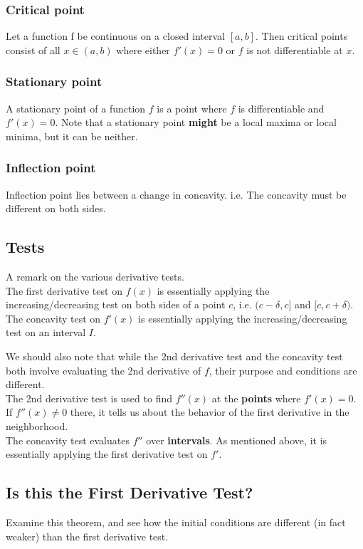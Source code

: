 \documentclass{article}
\begin{document}
\subsubsection{Critical point}
Let a function f be continuous on a closed interval $[a,b]$. Then critical points consist of all $x\in (a,b)$ where either $f'(x)=0$ or $f$ is not differentiable at $x$.
\subsubsection{Stationary point}
A stationary point of a function $f$ is a point where $f$ is differentiable and $f'(x)=0$. Note that a stationary point \textbf{might} be a local maxima or local minima, but it can be neither.

\subsubsection{Inflection point}
Inflection point lies between a change in concavity. i.e. The concavity must be different on both sides.

\subsection{Tests}
A remark on the various derivative tests.\\
The first derivative test on $f(x)$ is essentially applying the increasing/decreasing test on both sides of a point $c$, i.e. $(c-\delta,c]$ and $[c, c+\delta)$.\\
The concavity test on $f'(x)$ is essentially applying the increasing/decreasing test on an interval $I$.

We should also note that while the 2nd derivative test and the concavity test both involve evaluating the 2nd derivative of $f$, their purpose and conditions are different.\\
The 2nd derivative test is used to find $f''(x)$ at the \textbf{points} where $f'(x)=0$. If $f''(x)\neq 0$ there, it tells us about the behavior of the first derivative in the neighborhood.\\
The concavity test evaluates $f''$ over \textbf{intervals}. As mentioned above, it is essentially applying the first derivative test on $f'$.

\subsection{Is this the First Derivative Test?}
Examine this theorem, and see how the initial conditions are different (in fact weaker) than the first derivative test.
\end{document}
